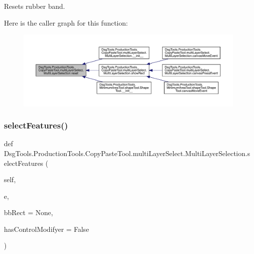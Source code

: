 \begin{DoxyVerb}Resets rubber band.
\end{DoxyVerb}
 Here is the caller graph for this function\+:
\nopagebreak
\begin{figure}[H]
\begin{center}
\leavevmode
\includegraphics[width=350pt]{class_dsg_tools_1_1_production_tools_1_1_copy_paste_tool_1_1multi_layer_select_1_1_multi_layer_selection_afde909a70b5cdef7ece12d9c51f0218d_icgraph}
\end{center}
\end{figure}
\mbox{\label{class_dsg_tools_1_1_production_tools_1_1_copy_paste_tool_1_1multi_layer_select_1_1_multi_layer_selection_a506db45cb8c41343be46a89578a9d59b}} 
\subsubsection{\texorpdfstring{select\+Features()}{selectFeatures()}}
{\footnotesize\ttfamily def Dsg\+Tools.\+Production\+Tools.\+Copy\+Paste\+Tool.\+multi\+Layer\+Select.\+Multi\+Layer\+Selection.\+select\+Features (\begin{DoxyParamCaption}\item[{}]{self,  }\item[{}]{e,  }\item[{}]{bb\+Rect = {\ttfamily None},  }\item[{}]{has\+Control\+Modifyer = {\ttfamily False} }\end{DoxyParamCaption})}

